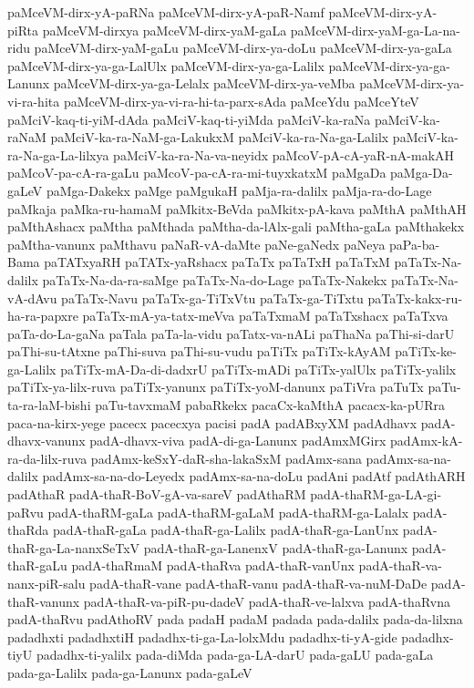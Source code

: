{paMceVM-dirx-yA-paRNa
paMceVM-dirx-yA-paR-Namf
paMceVM-dirx-yA-piRta
paMceVM-dirxya
paMceVM-dirx-yaM-gaLa
paMceVM-dirx-yaM-ga-La-na-ridu
paMceVM-dirx-yaM-gaLu
paMceVM-dirx-ya-doLu
paMceVM-dirx-ya-gaLa
paMceVM-dirx-ya-ga-LalUlx
paMceVM-dirx-ya-ga-Lalilx
paMceVM-dirx-ya-ga-Lanunx
paMceVM-dirx-ya-ga-Lelalx
paMceVM-dirx-ya-veMba
paMceVM-dirx-ya-vi-ra-hita
paMceVM-dirx-ya-vi-ra-hi-ta-parx-sAda
paMceYdu
paMceYteV
paMciV-kaq-ti-yiM-dAda
paMciV-kaq-ti-yiMda
paMciV-ka-raNa
paMciV-ka-raNaM
paMciV-ka-ra-NaM-ga-LakukxM
paMciV-ka-ra-Na-ga-Lalilx
paMciV-ka-ra-Na-ga-La-lilxya
paMciV-ka-ra-Na-va-neyidx
paMcoV-pA-cA-yaR-nA-makAH
paMcoV-pa-cA-ra-gaLu
paMcoV-pa-cA-ra-mi-tuyxkatxM
paMgaDa
paMga-Da-gaLeV
paMga-Dakekx
paMge
paMgukaH
paMja-ra-dalilx
paMja-ra-do-Lage
paMkaja
paMka-ru-hamaM
paMkitx-BeVda
paMkitx-pA-kava
paMthA
paMthAH
paMthAshacx
paMtha
paMthada
paMtha-da-lAlx-gali
paMtha-gaLa
paMthakekx
paMtha-vanunx
paMthavu
paNaR-vA-daMte
paNe-gaNedx
paNeya
paPa-ba-Bama
paTATxyaRH
paTATx-yaRshacx
paTaTx
paTaTxH
paTaTxM
paTaTx-Na-dalilx
paTaTx-Na-da-ra-saMge
paTaTx-Na-do-Lage
paTaTx-Nakekx
paTaTx-Na-vA-dAvu
paTaTx-Navu
paTaTx-ga-TiTxVtu
paTaTx-ga-TiTxtu
paTaTx-kakx-ru-ha-ra-papxre
paTaTx-mA-ya-tatx-meVva
paTaTxmaM
paTaTxshacx
paTaTxva
paTa-do-La-gaNa
paTala
paTa-la-vidu
paTatx-va-nALi
paThaNa
paThi-si-darU
paThi-su-tAtxne
paThi-suva
paThi-su-vudu
paTiTx
paTiTx-kAyAM
paTiTx-ke-ga-Lalilx
paTiTx-mA-Da-di-dadxrU
paTiTx-mADi
paTiTx-yalUlx
paTiTx-yalilx
paTiTx-ya-lilx-ruva
paTiTx-yanunx
paTiTx-yoM-danunx
paTiVra
paTuTx
paTu-ta-ra-laM-bishi
paTu-tavxmaM
pabaRkekx
pacaCx-kaMthA
pacacx-ka-pURra
paca-na-kirx-yege
pacecx
pacecxya
pacisi
padA
padABxyXM
padAdhavx
padA-dhavx-vanunx
padA-dhavx-viva
padA-di-ga-Lanunx
padAmxMGirx
padAmx-kA-ra-da-lilx-ruva
padAmx-keSxY-daR-sha-lakaSxM
padAmx-sana
padAmx-sa-na-dalilx
padAmx-sa-na-do-Leyedx
padAmx-sa-na-doLu
padAni
padAtf
padAthARH
padAthaR
padA-thaR-BoV-gA-va-sareV
padAthaRM
padA-thaRM-ga-LA-gi-paRvu
padA-thaRM-gaLa
padA-thaRM-gaLaM
padA-thaRM-ga-Lalalx
padA-thaRda
padA-thaR-gaLa
padA-thaR-ga-Lalilx
padA-thaR-ga-LanUnx
padA-thaR-ga-La-nanxSeTxV
padA-thaR-ga-LanenxV
padA-thaR-ga-Lanunx
padA-thaR-gaLu
padA-thaRmaM
padA-thaRva
padA-thaR-vanUnx
padA-thaR-va-nanx-piR-salu
padA-thaR-vane
padA-thaR-vanu
padA-thaR-va-nuM-DaDe
padA-thaR-vanunx
padA-thaR-va-piR-pu-dadeV
padA-thaR-ve-lalxva
padA-thaRvna
padA-thaRvu
padAthoRV
pada
padaH
padaM
padada
pada-dalilx
pada-da-lilxna
padadhxti
padadhxtiH
padadhx-ti-ga-La-lolxMdu
padadhx-ti-yA-gide
padadhx-tiyU
padadhx-ti-yalilx
pada-diMda
pada-ga-LA-darU
pada-gaLU
pada-gaLa
pada-ga-Lalilx
pada-ga-Lanunx
pada-gaLeV
}

